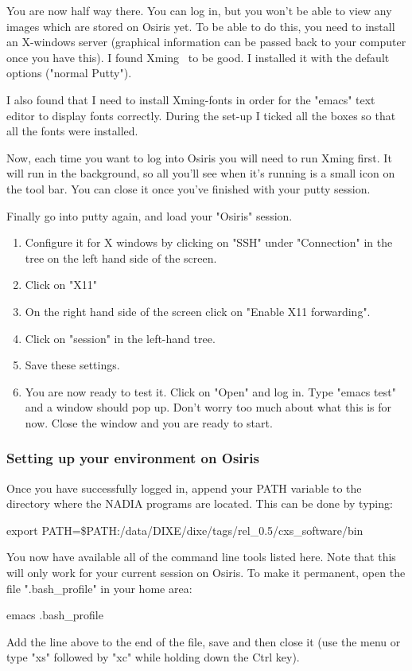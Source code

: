 \documentclass[]{nadia}
\begin{document}
You are now half way there. You can log in, but you won't be able to
view any images which are stored on Osiris yet. To be able to do this,
you need to install an X-windows server (graphical information can be
passed back to your computer once you have this). I found
Xming~\cite{xming} to be good. I installed it with the default options
("normal Putty").

I also found that I need to install Xming-fonts in order for the
"emacs" text editor to display fonts correctly. During the set-up I
ticked all the boxes so that all the fonts were installed.

Now, each time you want to log into Osiris you will need to run Xming
first. It will run in the background, so all you'll see when it's
running is a small icon on the tool bar. You can close it once you've
finished with your putty session.

Finally go into putty again, and load your "Osiris" session. 
\begin{enumerate}
\item Configure it for X windows by clicking on "SSH" under "Connection" in the tree on the left hand side of the screen. 
\item Click on "X11" 
\item On the right hand side of the screen click on "Enable X11 forwarding". 
\item Click on "session" in the left-hand tree. 
\item Save these settings. 
\item You are now ready to test it. Click on "Open" and log in. Type
  "emacs test" and a window should pop up. Don't worry too much about
  what this is for now. Close the window and you are ready to start.
\end{enumerate}

\subsubsection{Setting up your environment on Osiris}
\label{osiris-setup}
Once you have successfully logged in, append your PATH variable to the
directory where the NADIA programs are located. This can be done by
typing:
\begin{myverbatim}
  export PATH=\$PATH:/data/DIXE/dixe/tags/rel_0.5/cxs_software/bin 
\end{myverbatim}

You now have available all of the command line tools listed here. Note
that this will only work for your current session on Osiris. To make
it permanent, open the file ".bash\_profile" in your home area:
\begin{myverbatim}
  emacs .bash_profile 
\end{myverbatim}
Add the line above to the end of the file, save and then close it (use
the menu or type "xs" followed by "xc" while holding down the Ctrl
key).
\end{document}
